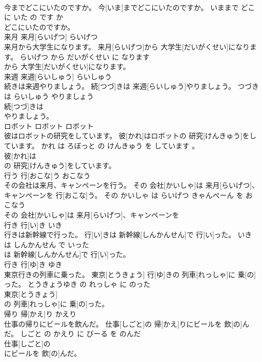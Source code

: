 \documentclass[8pt]{extreport}
\begin{document}
\begin{CJK}{UTF8}{min}
\\	今までどこにいたのですか。	今[いま]までどこにいたのですか。	いままで どこ に いた の です か	
\\	どこにいたのですか。			
\\	来月	来月[らいげつ]	らいげつ	
\\	来月から大学生になります。	来月[らいげつ]から 大学生[だいがくせい]になります。	らいげつ から だいがくせい に なります	
\\	から 大学生[だいがくせい]になります。			
\\	来週	来週[らいしゅう]	らいしゅう	
\\	続きは来週やりましょう。	続[つづ]きは 来週[らいしゅう]やりましょう。	つづき は らいしゅう やりましょう	
\\	続[つづ]きは
\\	やりましょう。			
\\	ロボット	ロボット	ロボット	
\\	彼はロボットの研究をしています。	彼[かれ]はロボットの 研究[けんきゅう]をしています。	かれ は ろぼっと の けんきゅう を しています 。	
\\	彼[かれ]は
\\	の 研究[けんきゅう]をしています。			
\\	行う	行[おこな]う	おこなう	
\\	その会社は来月、キャンペーンを行う。	その 会社[かいしゃ]は 来月[らいげつ]、キャンペーンを 行[おこな]う。	その かいしゃ は らいげつ きゃんぺーん を おこなう	
\\	その 会社[かいしゃ]は 来月[らいげつ]、キャンペーンを
\\	行き	行[い]き	いき	
\\	行きは新幹線で行った。	行[い]きは 新幹線[しんかんせん]で 行[い]った。	いき は しんかんせん で いった	
\\	は 新幹線[しんかんせん]で 行[い]った。			
\\	行き	行[ゆ]き	ゆき	
\\	東京行きの列車に乗った。	東京[とうきょう] 行[ゆ]きの 列車[れっしゃ]に 乗[の]った。	とうきょうゆき の れっしゃ に のった	
\\	東京[とうきょう]
\\	の 列車[れっしゃ]に 乗[の]った。			
\\	帰り	帰[かえ]り	かえり	
\\	仕事の帰りにビールを飲んだ。	仕事[しごと]の 帰[かえ]りにビールを 飲[の]んだ。	しごと の かえり に びーる を のんだ	
\\	仕事[しごと]の
\\	にビールを 飲[の]んだ。			

\end{CJK}
\end{document}
